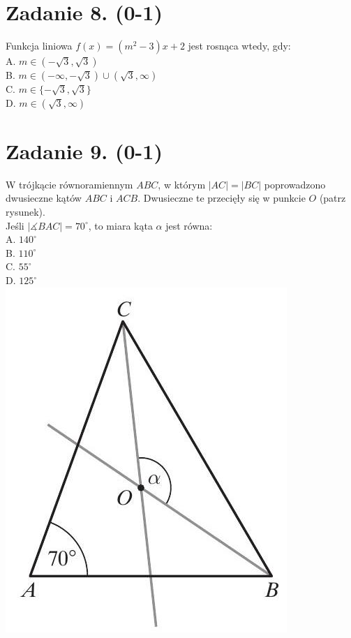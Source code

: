 \documentclass[10pt]{article}
\begin{document}
\section*{Zadanie 8. (0-1)}
Funkcja liniowa \(f(x)=\left(m^{2}-3\right) x+2\) jest rosnąca wtedy, gdy:\\
A. \(m \in(-\sqrt{3}, \sqrt{3})\)\\
B. \(m \in(-\infty,-\sqrt{3}) \cup(\sqrt{3}, \infty)\)\\
C. \(m \in\{-\sqrt{3}, \sqrt{3}\}\)\\
D. \(m \in(\sqrt{3}, \infty)\)

\section*{Zadanie 9. (0-1)}
W trójkącie równoramiennym \(A B C\), w którym \(|A C|=|B C|\) poprowadzono dwusieczne kątów \(A B C\) i \(A C B\). Dwusieczne te przecięły się w punkcie \(O\) (patrz rysunek).\\
Jeśli \(|\measuredangle B A C|=70^{\circ}\), to miara kąta \(\alpha\) jest równa:\\
A. \(140^{\circ}\)\\
B. \(110^{\circ}\)\\
C. \(55^{\circ}\)\\
D. \(125^{\circ}\)\\
\includegraphics[max width=\textwidth, center]{2024_11_21_e15da647cf0a41077ac3g-04}
\end{document}
